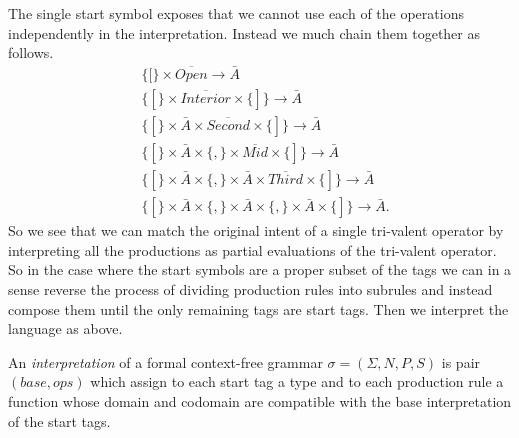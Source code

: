 The single start symbol exposes that we cannot use each of the operations 
independently in the interpretation.  Instead we much chain them together as follows.
\begin{align*}
    & \{[\}\times 
        \overline{Open}
    \to \bar{A}\\
    & \{[\}\times 
        \overline{Interior}
    \times \{]\}\to \bar{A}\\
    & \{[\}\times \bar{A}\times 
        \overline{Second}
    \times \{]\}\to \bar{A}\\
    & \{[\}\times \bar{A}\times  \{,\}
        \times \overline{Mid}
    \times \{]\}\to \bar{A}\\
    & \{[\}\times \bar{A}\times  \{,\}\times \bar{A}\times 
        \overline{Third}
    \times \{]\}\to \bar{A}\\
    & \{[\}\times \bar{A}\times  \{,\}\times \bar{A}\times \{,\}\times \bar{A}
    \times \{]\}\to \bar{A}.
\end{align*}
So we see that we can match the original intent of a single tri-valent operator 
by interpreting all the productions as partial evaluations of the 
tri-valent operator.  So in the case where the start symbols are a proper 
subset of the tags we can in a sense reverse the process of dividing production 
rules into subrules and instead compose them until the only remaining tags 
are start tags.  Then we interpret the language as above.  

\begin{definition}
    An \emph{interpretation} of a formal context-free grammar $\sigma=(\Sigma,N,P,S)$ 
    is pair $(base,ops)$ which assign to each start tag a type and 
    to each production rule a function whose domain and codomain are compatible 
    with the base interpretation of the start tags.
\end{definition}
